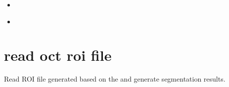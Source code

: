 \documentclass[letterpaper,10pt,english]{sphinxmanual}
\begin{document}
\begin{fulllineitems}
\begin{quote}
\begin{description}
\begin{itemize}
\end{itemize}


\end{description}\end{quote}



\begin{itemize}
\item {} 
{\hyperref[\detokenize{index:util.polar2cartesian.polar2cartesian_large_3d_file}]{}}

\item {} 
{\hyperref[\detokenize{index:util.read_oct_roi_file.read_oct_roi_file}]{}}

\end{itemize}



\end{fulllineitems}



\section{read oct roi file}
\label{\detokenize{index:module-util.read_oct_roi_file}}\label{\detokenize{index:read-oct-roi-file}}
Read ROI file generated based on the and generate segmentation results.
\end{document}
